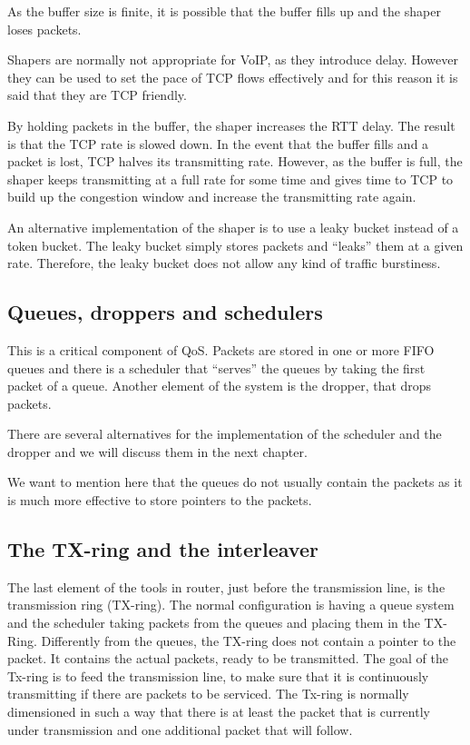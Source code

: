 As the buffer size is finite, it is possible that the buffer fills up and the shaper loses packets.

Shapers are normally not appropriate for VoIP, as they introduce delay.
However they can be used to set the pace of TCP flows effectively and for this reason it is said that they are TCP friendly.

By holding packets in the buffer, the shaper increases the RTT delay.
The result is that the TCP rate is slowed down.
In the event that the buffer fills and a packet is lost, TCP halves its transmitting rate.
However, as the buffer is full, the shaper keeps transmitting at a full rate for some time and gives time to TCP to build up the congestion window and increase the transmitting rate again.

An alternative implementation of the shaper is to use a leaky bucket instead of a token bucket.
The leaky bucket simply stores packets and ``leaks'' them at a given rate.
Therefore, the leaky bucket does not allow any kind of traffic burstiness.

\subsection{Queues, droppers and schedulers}

This is a critical component of QoS.
Packets are stored in one or more FIFO queues and there is a scheduler that ``serves'' the queues by taking the first packet of a queue.
Another element of the system is the dropper, that drops packets.

There are several alternatives for the implementation of the scheduler and the dropper and we will discuss them in the next chapter.

We want to mention here that the queues do not usually contain the packets as it is much more effective to store pointers to the packets.

\subsection{The TX-ring and the interleaver}
The last element of the tools in router, just before the transmission line, is the transmission ring (TX-ring).
The normal configuration is having a queue system and the scheduler taking packets from the queues and placing them in the TX-Ring.
Differently from the queues, the TX-ring does not contain a pointer to the packet.
It contains the actual packets, ready to be transmitted.
The goal of the Tx-ring is to feed the transmission line, to make sure that it is continuously transmitting if there are packets to be serviced.
The Tx-ring is normally dimensioned in such a way that there is at least the packet that is currently under transmission and one additional packet that will follow.

